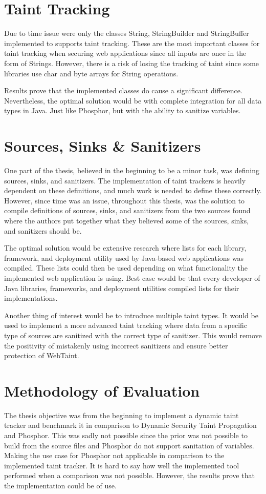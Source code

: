 \section{Taint Tracking}
\label{propagation}
Due to time issue were only the classes String, StringBuilder and StringBuffer implemented to supports taint tracking. These are the most important classes for taint tracking when securing web applications since all inputs are once in the form of Strings. However, there is a risk of losing the tracking of taint since some libraries use char and byte arrays for String operations.

Results prove that the implemented classes do cause a significant difference. Nevertheless, the optimal solution would be with complete integration for all data types in Java. Just like Phosphor, but with the ability to sanitize variables.



\section{Sources, Sinks \& Sanitizers}
\label{sss}
One part of the thesis, believed in the beginning to be a minor task, was defining sources, sinks, and sanitizers. The implementation of taint trackers is heavily dependent on these definitions, and much work is needed to define these correctly. However, since time was an issue, throughout this thesis, was the solution to compile definitions of sources, sinks, and sanitizers from the two sources found where the authors put together what they believed some of the sources, sinks, and sanitizers should be.

The optimal solution would be extensive research where lists for each library, framework, and deployment utility used by Java-based web applications was compiled. These lists could then be used depending on what functionality the implemented web application is using. Best case would be that every developer of Java libraries, frameworks, and deployment utilities compiled lists for their implementations.

Another thing of interest would be to introduce multiple taint types. It would be used to implement a more advanced taint tracking where data from a specific type of sources are sanitized with the correct type of sanitizer. This would remove the positivity of mistakenly using incorrect sanitizers and ensure better protection of WebTaint.



\section{Methodology of Evaluation}
\label{methev}
The thesis objective was from the beginning to implement a dynamic taint tracker and benchmark it in comparison to Dynamic Security Taint Propagation and Phosphor. This was sadly not possible since the prior was not possible to build from the source files and Phosphor do not support sanitation of variables. Making the use case for Phosphor not applicable in comparison to the implemented taint tracker. It is hard to say how well the implemented tool performed when a comparison was not possible. However, the results prove that the implementation could be of use.